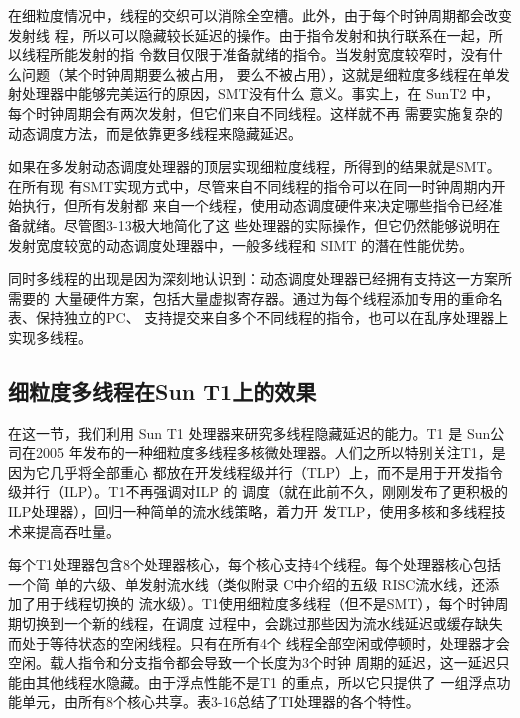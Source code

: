 在细粒度情况中，线程的交织可以消除全空槽。此外，由于每个时钟周期都会改变发射线
程，所以可以隐藏较长延迟的操作。由于指令发射和执行联系在一起，所以线程所能发射的指
令数目仅限于准备就绪的指令。当发射宽度较窄时，没有什么问题（某个时钟周期要么被占用，
要么不被占用），这就是细粒度多线程在单发射处理器中能够完美运行的原因，SMT没有什么
意义。事实上，在 SunT2 中，每个时钟周期会有两次发射，但它们来自不同线程。这样就不再
需要实施复杂的动态调度方法，而是依靠更多线程来隐藏延迟。

如果在多发射动态调度处理器的顶层实现细粒度线程，所得到的结果就是SMT。在所有现
有SMT实现方式中，尽管来自不同线程的指令可以在同一时钟周期内开始执行，但所有发射都
来自一个线程，使用动态调度硬件来决定哪些指令已经准备就绪。尽管图3-13极大地简化了这
些处理器的实际操作，但它仍然能够说明在发射宽度较宽的动态调度处理器中，一般多线程和
SIMT 的潛在性能优势。

同时多线程的出现是因为深刻地认识到：动态调度处理器已经拥有支持这一方案所需要的
大量硬件方案，包括大量虚拟寄存器。通过为每个线程添加专用的重命名表、保持独立的PC、
支持提交来自多个不同线程的指令，也可以在乱序处理器上实现多线程。

\subsection{细粒度多线程在Sun T1上的效果}

在这一节，我们利用 Sun T1 处理器来研究多线程隐藏延迟的能力。T1 是 Sun公司在2005
年发布的一种细粒度多线程多核微处理器。人们之所以特别关注T1，是因为它几乎将全部重心
都放在开发线程级并行（TLP）上，而不是用于开发指令级并行（ILP）。T1不再强调对ILP 的
调度（就在此前不久，刚刚发布了更积极的ILP处理器），回归一种简单的流水线策略，着力开
发TLP，使用多核和多线程技术来提高吞吐量。

每个T1处理器包含8个处理器核心，每个核心支持4个线程。每个处理器核心包括一个简
单的六级、单发射流水线（类似附录 C中介绍的五级 RISC流水线，还添加了用于线程切换的
流水级）。T1使用细粒度多线程（但不是SMT），每个时钟周期切换到一个新的线程，在调度
过程中，会跳过那些因为流水线延迟或缓存缺失而处于等待状态的空闲线程。只有在所有4个
线程全部空闲或停顿时，处理器才会空闲。载人指令和分支指令都会导致一个长度为3个时钟
周期的延迟，这一延迟只能由其他线程水隐藏。由于浮点性能不是T1 的重点，所以它只提供了
一组浮点功能单元，由所有8个核心共享。表3-16总结了TI处理器的各个特性。

